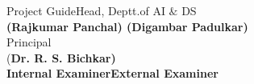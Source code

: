 \documentclass[pdftex,a4paper,11pt,oneside,openright]{report}
\begin{document}
\vspace{60pt}

\begin{center}		%

Project GuideHead, Deptt.of AI $\&$ DS\\
\normalsize{\bf{{(Rajkumar Panchal) }(Digambar Padulkar)}\\
}
\vspace{60pt}
Principal\\
(\bf Dr. R. S. Bichkar) \\


\vspace{60pt}
\bf{Internal ExaminerExternal Examiner}\\
\end{center}
\newpage
{}
\end{document}
